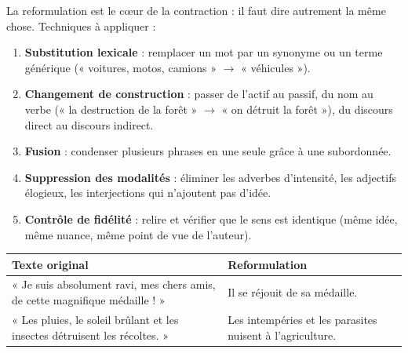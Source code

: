 \documentclass[11pt]{article}
\newcommand{\cle}[1]{{\popxbold\color{popdark}#1}}
\begin{document}
\begin{methode}
La \cle{reformulation} est le cœur de la contraction : il faut dire autrement la même chose. Techniques à appliquer :
\begin{enumerate}
\item \textbf{Substitution lexicale} : remplacer un mot par un synonyme ou un terme générique (« voitures, motos, camions » $\rightarrow$ « véhicules »).
\item \textbf{Changement de construction} : passer de l'actif au passif, du nom au verbe (« la destruction de la forêt » $\rightarrow$ « on détruit la forêt »), du discours direct au discours indirect.
\item \textbf{Fusion} : condenser plusieurs phrases en une seule grâce à une subordonnée.
\item \textbf{Suppression des modalités} : éliminer les adverbes d'intensité, les adjectifs élogieux, les interjections qui n'ajoutent pas d'idée.
\item \textbf{Contrôle de fidélité} : relire et vérifier que le sens est identique (même idée, même nuance, même point de vue de l'auteur).
\end{enumerate}
\begin{center}
\begin{tabularx}{\linewidth}{|X|X|}
\hline
\rowcolor{popblueL} \textbf{Texte original} & \textbf{Reformulation} \\
\hline
« Je suis absolument ravi, mes chers amis, de cette magnifique médaille ! » & Il se réjouit de sa médaille. \\
\hline
« Les pluies, le soleil brûlant et les insectes détruisent les récoltes. » & Les intempéries et les parasites nuisent à l'agriculture. \\
\hline
\end{tabularx}
\end{center}
\end{methode}
\end{document}
